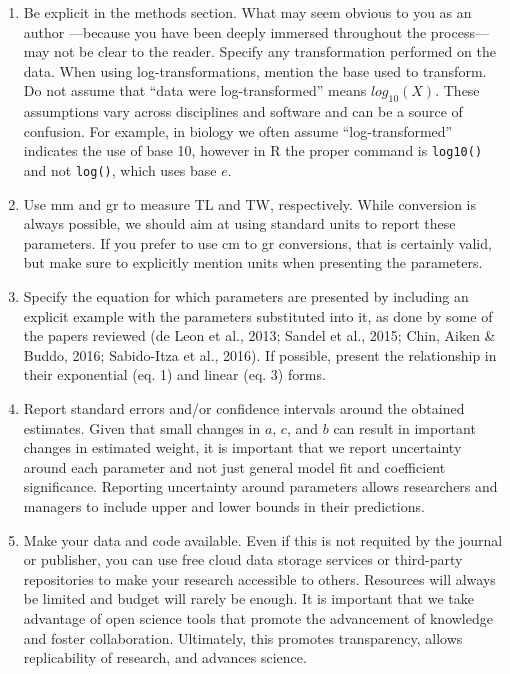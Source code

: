 \documentclass[12pt,]{article}
\begin{document}
\begin{enumerate}
\def\labelenumi{\arabic{enumi}.}
\item
  Be explicit in the methods section. What may seem obvious to you as an
  author ---because you have been deeply immersed throughout the
  process--- may not be clear to the reader. Specify any transformation
  performed on the data. When using log-transformations, mention the
  base used to transform. Do not assume that ``data were
  log-transformed'' means \(log_{10}(X)\). These assumptions vary across
  disciplines and software and can be a source of confusion. For
  example, in biology we often assume ``log-transformed'' indicates the
  use of base 10, however in R the proper command is \texttt{log10()}
  and not \texttt{log()}, which uses base \(e\).
\item
  Use mm and gr to measure TL and TW, respectively. While conversion is
  always possible, we should aim at using standard units to report these
  parameters. If you prefer to use cm to gr conversions, that is
  certainly valid, but make sure to explicitly mention units when
  presenting the parameters.
\item
  Specify the equation for which parameters are presented by including
  an explicit example with the parameters substituted into it, as done
  by some of the papers reviewed (de Leon et al., 2013; Sandel et al.,
  2015; Chin, Aiken \& Buddo, 2016; Sabido-Itza et al., 2016). If
  possible, present the relationship in their exponential (eq. 1) and
  linear (eq. 3) forms.
\item
  Report standard errors and/or confidence intervals around the obtained
  estimates. Given that small changes in \(a\), \(c\), and \(b\) can
  result in important changes in estimated weight, it is important that
  we report uncertainty around each parameter and not just general model
  fit and coefficient significance. Reporting uncertainty around
  parameters allows researchers and managers to include upper and lower
  bounds in their predictions.
\item
  Make your data and code available. Even if this is not requited by the
  journal or publisher, you can use free cloud data storage services or
  third-party repositories to make your research accessible to others.
  Resources will always be limited and budget will rarely be enough. It
  is important that we take advantage of open science tools that promote
  the advancement of knowledge and foster collaboration. Ultimately,
  this promotes transparency, allows replicability of research, and
  advances science.
\end{enumerate}
\end{document}
